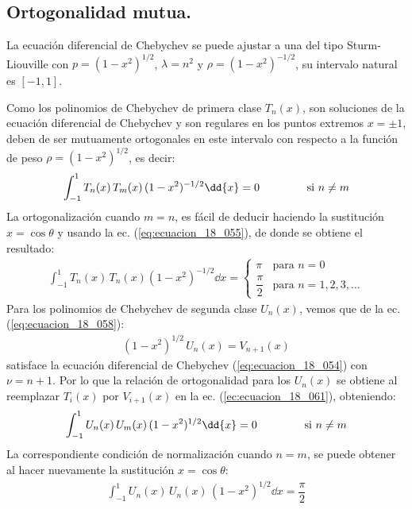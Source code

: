 \subsection{Ortogonalidad mutua.}
La ecuación diferencial de Chebychev se puede ajustar a una del tipo Sturm-Liouville con $p = (1 - x^{2})^{1/2}$, $\lambda = n^{2}$ y $\rho = (1 - x^{2})^{-1/2}$, su intervalo natural es $[-1, 1]$.
\par
Como los polinomios de Chebychev de primera clase $T_{n}(x)$, son soluciones de la ecuación diferencial de Chebychev y son regulares en los puntos extremos $x = \pm 1$, deben de ser mutuamente ortogonales en este intervalo con respecto a la función de peso $\rho = (1 - x^{2})^{1/2}$, es decir:
\begin{align}
\int_{-1}^{1} T_{n}(x) \, T_{m}(x) \, (1 - x^{2})^{-1/2} \dd{x} = 0 \hspace{1.5cm} \mbox{si  } n \neq m
\label{ec:ecuacion_18_061}
\end{align}
La ortogonalización cuando $m = n$, es fácil de deducir haciendo la sustitución $x = \cos \theta$ y usando la ec. (\ref{eq:ecuacion_18_055}), de donde se obtiene el resultado:
\begin{align}
\int_{-1}^{1} T_{n} (x) \, T_{n} (x) (1 - x^{2})^{-1/2} \dd{x} = \begin{cases}
\pi & \mbox{para  } n = 0 \\[0.5em]
\dfrac{\pi}{2} & \mbox{para  } n = 1, 2, 3, \ldots
\end{cases}
\label{eq:ecuacion_18_062}
\end{align}
Para los polinomios de Chebychev de segunda clase $U_{n}(x)$, vemos que de la ec. (\ref{eq:ecuacion_18_058}):
\begin{align*}
(1 - x^{2})^{1/2} \, U_{n} (x) = V_{n+1} (x)
\end{align*}
satisface la ecuación diferencial de Chebychev (\ref{eq:ecuacion_18_054}) con $\nu = n + 1$. Por lo que la relación de ortogonalidad para los $U_{n}(x)$ se obtiene al reemplazar $T_{i}(x)$ por $V_{i+1} (x)$ en la ec. (\ref{ec:ecuacion_18_061}), obteniendo:
\begin{align*}
\int_{-1}^{1} U_{n}(x) \, U_{m}(x) \, (1 - x^{2})^{1/2} \dd{x} = 0 \hspace{1.5cm} \mbox{si  } n \neq m
\end{align*}
La correspondiente condición de normalización cuando $n = m$, se puede obtener al hacer nuevamente la sustitución $x  = \cos \theta$:
\begin{align*}
\int_{-1}^{1} U_{n}(x) \, U_{n}(x) \, (1 - x^{2})^{1/2} \dd{x} = \dfrac{\pi}{2}
\end{align*}

